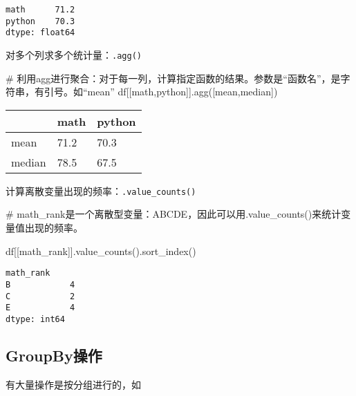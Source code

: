 \documentclass[
  letterpaper,
  DIV=11,
  numbers=noendperiod]{scrreprt}
\newenvironment{Shaded}{\begin{snugshade}}{\end{snugshade}}
\newcommand{\CommentTok}[1]{\textcolor[rgb]{0.37,0.37,0.37}{#1}}
\newcommand{\NormalTok}[1]{\textcolor[rgb]{0.00,0.23,0.31}{#1}}
\newcommand{\StringTok}[1]{\textcolor[rgb]{0.13,0.47,0.30}{#1}}
\begin{document}
\begin{verbatim}
math      71.2
python    70.3
dtype: float64
\end{verbatim}

对多个列求多个统计量：\texttt{.agg()}

\begin{Shaded}
\begin{Highlighting}[]

\CommentTok{\# 利用agg进行聚合：对于每一列，计算指定函数的结果。参数是“函数名”，是字符串，有引号。如“mean”}
\NormalTok{df[[}\StringTok{\textquotesingle{}math\textquotesingle{}}\NormalTok{,}\StringTok{\textquotesingle{}python\textquotesingle{}}\NormalTok{]].agg([}\StringTok{\textquotesingle{}mean\textquotesingle{}}\NormalTok{,}\StringTok{\textquotesingle{}median\textquotesingle{}}\NormalTok{])}
\end{Highlighting}
\end{Shaded}

\begin{longtable}[]{@{}lll@{}}
\toprule\noalign{}
& math & python \\
\midrule\noalign{}
\endhead
\bottomrule\noalign{}
\endlastfoot
mean & 71.2 & 70.3 \\
median & 78.5 & 67.5 \\
\end{longtable}

计算离散变量出现的频率：\texttt{.value\_counts()}

\begin{Shaded}
\begin{Highlighting}[]
\CommentTok{\# math\_rank是一个离散型变量：ABCDE，因此可以用.value\_counts()来统计变量值出现的频率。}

\NormalTok{df[[}\StringTok{\textquotesingle{}math\_rank\textquotesingle{}}\NormalTok{]].value\_counts().sort\_index()}
\end{Highlighting}
\end{Shaded}

\begin{verbatim}
math_rank
B            4
C            2
E            4
dtype: int64
\end{verbatim}

\hypertarget{groupbyux64cdux4f5c}{%
\subsection{GroupBy操作}\label{groupbyux64cdux4f5c}}

有大量操作是按分组进行的，如
\end{document}
